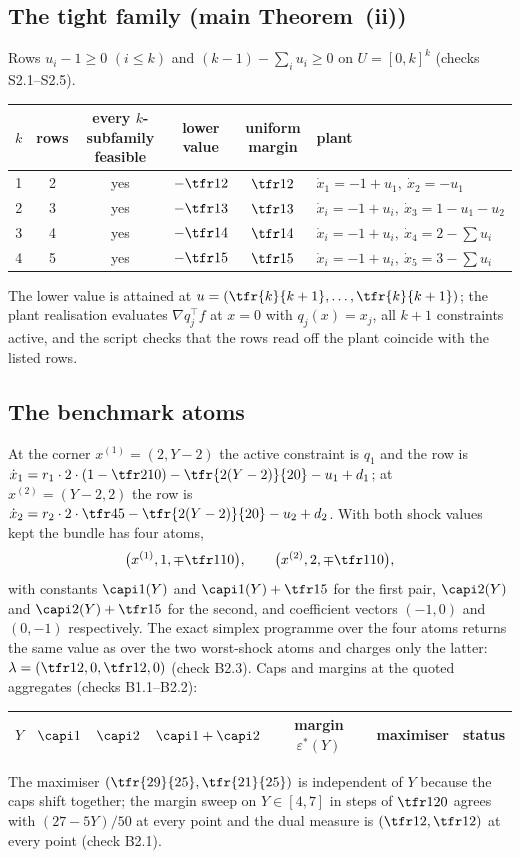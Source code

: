 \subsection{The tight family (main Theorem~(ii))}
Rows $u_i-1\ge0$ $(i\le k)$ and $(k-1)-\sum_iu_i\ge0$ on $U=[0,k]^k$ (checks S2.1--S2.5).
\begin{center}\footnotesize
\begin{tabular}{cccccl}
\toprule
$k$ & rows & every $k$-subfamily feasible & lower value & uniform margin & plant\\
\midrule
1 & 2 & yes & $-\tfr12$ & $\tfr12$ & $\dot x_1=-1+u_1,\ \dot x_2=-u_1$\\
2 & 3 & yes & $-\tfr13$ & $\tfr13$ & $\dot x_i=-1+u_i,\ \dot x_3=1-u_1-u_2$\\
3 & 4 & yes & $-\tfr14$ & $\tfr14$ & $\dot x_i=-1+u_i,\ \dot x_4=2-\sum u_i$\\
4 & 5 & yes & $-\tfr15$ & $\tfr15$ & $\dot x_i=-1+u_i,\ \dot x_5=3-\sum u_i$\\
\bottomrule
\end{tabular}
\end{center}
The lower value is attained at $u=(\tfr{k}{k+1},\dots,\tfr{k}{k+1})$; the plant realisation evaluates $\nabla q_j^\top f$ at $x=0$ with $q_j(x)=x_j$, all $k+1$ constraints active, and the script checks that the rows read off the plant coincide with the listed rows.

\subsection{The benchmark atoms}
At the corner $x^{(1)}=(2,Y-2)$ the active constraint is $q_1$ and the row is $\dot x_1=r_1\cdot2\cdot(1-\tfr2{10})-\tfr{2(Y-2)}{20}-u_1+d_1$; at $x^{(2)}=(Y-2,2)$ the row is $\dot x_2=r_2\cdot2\cdot\tfr45-\tfr{2(Y-2)}{20}-u_2+d_2$. With both shock values kept the bundle has four atoms,
\[
\bigl(x^{(1)},1,\mp\tfr1{10}\bigr),\qquad \bigl(x^{(2)},2,\mp\tfr1{10}\bigr),
\]
with constants $\capi1(Y)$ and $\capi1(Y)+\tfr15$ for the first pair, $\capi2(Y)$ and $\capi2(Y)+\tfr15$ for the second, and coefficient vectors $(-1,0)$ and $(0,-1)$ respectively. The exact simplex programme over the four atoms returns the same value as over the two worst-shock atoms and charges only the latter: $\lambda=(\tfr12,0,\tfr12,0)$ (check B2.3). Caps and margins at the quoted aggregates (checks B1.1--B2.2):
\begin{center}\footnotesize
\begin{tabularx}{\textwidth}{cccccc>{\raggedright\arraybackslash}X}
\toprule
$Y$ & $\capi1$ & $\capi2$ & $\capi1+\capi2$ & margin $\varepsilon^\ast(Y)$ & maximiser & status\\
\midrule

\bottomrule
\end{tabularx}
\end{center}
The maximiser $(\tfr{29}{25},\tfr{21}{25})$ is independent of $Y$ because the caps shift together; the margin sweep on $Y\in[4,7]$ in steps of $\tfr1{20}$ agrees with $(27-5Y)/50$ at every point and the dual measure is $(\tfr12,\tfr12)$ at every point (check B2.1).

